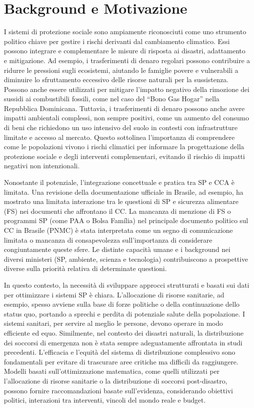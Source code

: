 \documentclass{article}
\begin{document}
\section{Background e Motivazione}
I sistemi di protezione sociale sono ampiamente riconosciuti come uno strumento politico chiave per gestire i rischi derivanti dal cambiamento climatico. Essi possono integrare e complementare le misure di risposta ai disastri, adattamento e mitigazione. Ad esempio, i trasferimenti di denaro regolari possono contribuire a ridurre le pressioni sugli ecosistemi, aiutando le famiglie povere e vulnerabili a diminuire lo sfruttamento eccessivo delle risorse naturali per la sussistenza. Possono anche essere utilizzati per mitigare l'impatto negativo della rimozione dei sussidi ai combustibili fossili, come nel caso del ``Bono Gas Hogar'' nella Repubblica Dominicana. Tuttavia, i trasferimenti di denaro possono anche avere impatti ambientali complessi, non sempre positivi, come un aumento del consumo di beni che richiedono un uso intensivo del suolo in contesti con infrastrutture limitate e accesso al mercato. Questo sottolinea l'importanza di comprendere come le popolazioni vivono i rischi climatici per informare la progettazione della protezione sociale e degli interventi complementari, evitando il rischio di impatti negativi non intenzionali.

Nonostante il potenziale, l'integrazione concettuale e pratica tra SP e CCA è limitata. Una revisione della documentazione ufficiale in Brasile, ad esempio, ha mostrato una limitata interazione tra le questioni di SP e sicurezza alimentare (FS) nei documenti che affrontano il CC. La mancanza di menzione di FS o programmi SP (come PAA o Bolsa Família) nel principale documento politico sul CC in Brasile (PNMC) è stata interpretata come un segno di comunicazione limitata o mancanza di consapevolezza sull'importanza di considerare congiuntamente queste sfere. Le distinte capacità umane e i background nei diversi ministeri (SP, ambiente, scienza e tecnologia) contribuiscono a prospettive diverse sulla priorità relativa di determinate questioni.

In questo contesto, la necessità di sviluppare approcci strutturati e basati sui dati per ottimizzare i sistemi SP è chiara. L'allocazione di risorse sanitarie, ad esempio, spesso avviene sulla base di forze politiche o della continuazione dello status quo, portando a sprechi e perdita di potenziale salute della popolazione. I sistemi sanitari, per servire al meglio le persone, devono operare in modo efficiente ed equo. Similmente, nel contesto dei disastri naturali, la distribuzione dei soccorsi di emergenza non è stata sempre adeguatamente affrontata in studi precedenti. L'efficacia e l'equità del sistema di distribuzione complessivo sono fondamentali per evitare di trascurare aree critiche ma difficili da raggiungere. Modelli basati sull'ottimizzazione matematica, come quelli utilizzati per l'allocazione di risorse sanitarie o la distribuzione di soccorsi post-disastro, possono fornire raccomandazioni basate sull'evidenza, considerando obiettivi politici, interazioni tra interventi, vincoli del mondo reale e budget.
\end{document}
